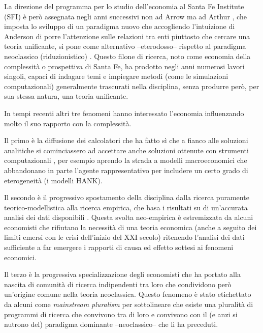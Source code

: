 \documentclass[a4paper, headings=standardclasses]{scrartcl}
\begin{document}
La direzione del programma per lo studio dell'economia al Santa Fe Institute (SFI) è però assegnata negli anni successivi non ad Arrow ma ad Arthur \parencite{fontana2010a}, che imposta lo sviluppo di un paradigma nuovo che accogliendo l'intuizione di Anderson di porre l'attenzione sulle relazioni tra enti piuttosto che cercare una teoria unificante, si pone come alternativo {--eterodosso--} rispetto al paradigma neoclassico (riduzionistico) \parencite{arthur2021, fontana2010}.
Questo filone di ricerca, noto come economia della complessità o prospettiva di Santa Fe, ha prodotto negli anni numerosi lavori singoli, capaci di indagare temi e impiegare metodi (come le simulazioni computazionali) generalmente trascurati nella disciplina, senza produrre però, per sua stessa natura, una teoria unificante.

In tempi recenti altri tre fenomeni hanno interessato l'economia influenzando molto il suo rapporto con la complessità.

Il primo è la diffusione dei calcolatori che ha fatto sì che a fianco alle soluzioni analitiche si cominciassero ad accettare anche soluzioni ottenute con strumenti computazionali \parencite{cherrier2023, backhouse2016}, per esempio aprendo la strada a modelli macroeconomici che abbandonano in parte l'agente rappresentativo per includere un certo grado di eterogeneità (i modelli HANK).

Il secondo è il progressivo spostamento della disciplina dalla ricerca puramente teorico-model\-listica alla ricerca empirica, che basa i risultati su di un'accurata analisi dei dati disponibili \parencite{cherrier2018, backhouse2017}.
Questa svolta neo-empirica è estremizzata da alcuni economisti che rifiutano la necessità di una teoria economica (anche a seguito dei limiti emersi con le crisi dell'inizio del XXI secolo) ritenendo l'analisi dei dati sufficiente a far emergere i rapporti di causa ed effetto sottesi ai fenomeni economici.

Il terzo è la progressiva specializzazione degli economisti che ha portato alla nascita di comunità di ricerca indipendenti tra loro che condividono però un'origine comune nella teoria neoclassica. Questo fenomeno è stato etichettato da alcuni come \textit{mainstream pluralism} \parencite{cedrini2018, davis2006, davis2019a} per sottolineare che esiste una pluralità di programmi di ricerca che convivono tra di loro e convivono con il (e anzi si nutrono del) paradigma dominante --neoclassico-- che li ha preceduti.
\end{document}
